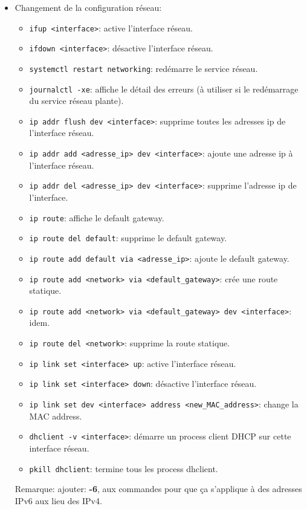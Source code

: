 \documentclass[a4paper]{article}
\renewcommand{\tt}{\texttt}
\begin{document}
\begin{itemize}
\item Changement de la configuration réseau:
\begin{itemize}
    \item \tt{ifup <interface>}: active l'interface réseau.
    \item \tt{ifdown <interface>}: désactive l'interface réseau.
    \item \tt{systemctl restart networking}: redémarre le service réseau.
    \item \tt{journalctl -xe}: affiche le détail des erreurs (à utiliser si le redémarrage du service réseau plante).
    \item \tt{ip addr flush dev <interface>}: supprime toutes les adresses ip de l'interface réseau.
    \item \tt{ip addr add <adresse\_ip> dev <interface>}: ajoute une adresse ip à l'interface réseau.
    \item \tt{ip addr del <adresse\_ip> dev <interface>}: supprime l'adresse ip de l'interface.
    \item \tt{ip route}: affiche le default gateway.
    \item \tt{ip route del default}: supprime le default gateway.
    \item \tt{ip route add default via <adresse\_ip>}: ajoute le default gateway.
    \item \tt{ip route add <network> via <default\_gateway>}: crée une route statique.
    \item \tt{ip route add <network> via <default\_gateway> dev <interface>}: idem.
    \item \tt{ip route del <network>}: supprime la route statique.
    \item \tt{ip link set <interface> up}: active l'interface réseau.
    \item \tt{ip link set <interface> down}: désactive l'interface réseau.
    \item \tt{ip link set dev <interface> address <new\_MAC\_address>}: change la MAC address.
    \item \tt{dhclient -v <interface>}: démarre un process client DHCP sur cette interface réseau.
    \item \tt{pkill dhclient}: termine tous les process dhclient.
\end{itemize}
Remarque: ajouter: \textbf{-6}, aux commandes pour que ça s'applique à des adresses IPv6 aux lieu des IPv4.






\end{itemize}
\end{document}
